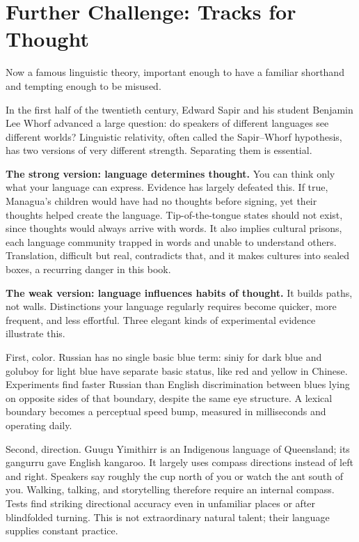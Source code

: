 \section{Further Challenge: Tracks for Thought}
Now a famous linguistic theory, important enough to have a familiar shorthand and tempting enough to be misused.

In the first half of the twentieth century, Edward Sapir and his student Benjamin Lee Whorf advanced a large question: do speakers of different languages see different worlds? Linguistic relativity, often called the Sapir--Whorf hypothesis, has two versions of very different strength. Separating them is essential.

\textbf{The strong version: language determines thought.} You can think only what your language can express. Evidence has largely defeated this. If true, Managua's children would have had no thoughts before signing, yet their thoughts helped create the language. Tip-of-the-tongue states should not exist, since thoughts would always arrive with words. It also implies cultural prisons, each language community trapped in words and unable to understand others. Translation, difficult but real, contradicts that, and it makes cultures into sealed boxes, a recurring danger in this book.

\textbf{The weak version: language influences habits of thought.} It builds paths, not walls. Distinctions your language regularly requires become quicker, more frequent, and less effortful. Three elegant kinds of experimental evidence illustrate this.

First, color. Russian has no single basic blue term: siniy for dark blue and goluboy for light blue have separate basic status, like red and yellow in Chinese. Experiments find faster Russian than English discrimination between blues lying on opposite sides of that boundary, despite the same eye structure. A lexical boundary becomes a perceptual speed bump, measured in milliseconds and operating daily.

Second, direction. Guugu Yimithirr is an Indigenous language of Queensland; its gangurru gave English kangaroo. It largely uses compass directions instead of left and right. Speakers say roughly the cup north of you or watch the ant south of you. Walking, talking, and storytelling therefore require an internal compass. Tests find striking directional accuracy even in unfamiliar places or after blindfolded turning. This is not extraordinary natural talent; their language supplies constant practice.

